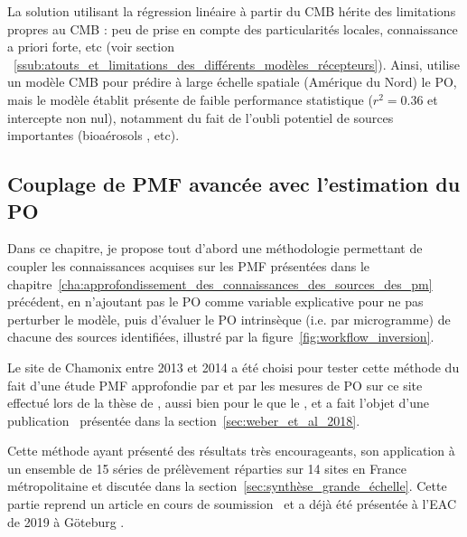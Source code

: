 La solution utilisant la régression linéaire à partir du CMB hérite des limitations
propres au CMB : peu de prise en compte des particularités locales, connaissance a priori
forte, etc (voir section
~\ref{ssub:atouts_et_limitations_des_différents_modèles_récepteurs}).
Ainsi, \cite{batesSource2018} utilise un modèle CMB pour prédire à large échelle spatiale
(Amérique du Nord) le PO, mais le modèle établit présente de faible performance
statistique ($r^2 = 0.36$ et intercepte non nul), notamment du fait de l'oubli potentiel de
sources importantes (bioaérosols \autocite{samakeUnexpected2017}, etc).

\subsection{Couplage de PMF avancée avec l'estimation du PO}%
\label{sub:couplage_de_pmf_avancée_avec_l_estimation_du_po}

Dans ce chapitre, je propose tout d'abord une méthodologie permettant de coupler les
connaissances acquises sur les PMF présentées
dans le chapitre~\ref{cha:approfondissement_des_connaissances_des_sources_des_pm}
précédent, en n'ajoutant pas le PO comme variable explicative pour ne pas perturber le
modèle, puis d'évaluer le PO intrinsèque (i.e. par microgramme) de chacune des sources
identifiées, illustré par la figure~\ref{fig:workflow_inversion}.

Le site de Chamonix entre 2013 et 2014 a été choisi pour tester cette méthode du fait
d'une étude PMF approfondie par \cite{chevrierChauffage2016} et par les mesures de PO sur
ce site effectué lors de la thèse de \cite{calasPollution2017}, aussi bien pour le \POAA{}
que le \PODTT, et a fait l'objet d'une publication~\autocite{weberApportionment2018}
présentée dans la section~\ref{sec:weber_et_al_2018}.

Cette méthode ayant présenté des résultats très encourageants, son application à un
ensemble de 15 séries de prélèvement réparties sur 14 sites en France métropolitaine et
discutée dans la section~\ref{sec:synthèse_grande_échelle}.
Cette partie reprend un article en cours de soumission~\autocite{weberSourceinprep.} et a
déjà été présentée à l'EAC de 2019 à Göteburg \autocite{weberSources2019}.

